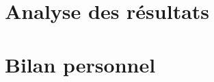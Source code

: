 
\section{Analyse des résultats}
\label{chap4:section1}
{\fontsize{14pt}{16pt}\selectfont
    
}

\newpage

\section{Bilan personnel}
\label{chap4:section2}
{\fontsize{14pt}{16pt}\selectfont
    
}